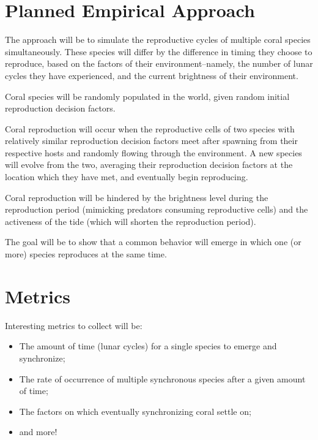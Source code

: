 \documentclass{article}
\begin{document}
\section{Planned Empirical Approach}
The approach will be to simulate the reproductive cycles of multiple coral
species simultaneously. These species will differ by the difference in timing
they choose to reproduce, based on the factors of their environment--namely, the
number of lunar cycles they have experienced, and the current brightness of
their environment.

Coral species will be randomly populated in the world, given random initial
reproduction decision factors.

Coral reproduction will occur when the reproductive cells of two species with
relatively similar reproduction decision factors meet after spawning from their
respective hosts and randomly flowing through the environment. A new species
will evolve from the two, averaging their reproduction decision factors at the
location which they have met, and eventually begin reproducing.

Coral reproduction will be hindered by the brightness level during the
reproduction period (mimicking predators consuming reproductive cells) and the
activeness of the tide (which will shorten the reproduction period).

The goal will be to show that a common behavior will emerge in which one (or
more) species reproduces at the same time.

\section{Metrics}
Interesting metrics to collect will be:
\begin{itemize}
    \item The amount of time (lunar cycles) for a single species to emerge and
    synchronize;
    \item The rate of occurrence of multiple synchronous species after a given
    amount of time;
    \item The factors on which eventually synchronizing coral settle on;
    \item and more!
\end{itemize}
\end{document}
